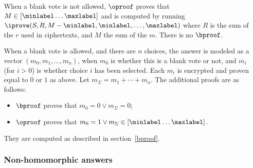 \documentclass[a4paper]{article}
\begin{document}
When a blank vote is not allowed, $\oproof$ proves that
$M\in[\minlabel\dots\maxlabel]$ and is computed by running
$\iprove(S,R,M-\minlabel,\minlabel,\dots,\maxlabel)$ where $R$ is the
sum of the $r$ used in ciphertexts, and $M$ the sum of the $m$. There
is no $\bproof$.

When a blank vote is allowed, and there are $n$ choices, the answer is
modeled as a vector $(m_0,m_1,\dotsc,m_n)$, when $m_0$ is whether this
is a blank vote or not, and $m_i$ (for $i>0$) is whether choice $i$
has been selected. Each $m_i$ is encrypted and proven equal to $0$ or
$1$ as above. Let $m_\Sigma=m_1+\dotsb+m_n$. The additional proofs
are as follows:
\begin{itemize}
\item $\bproof$ proves that $m_0=0\lor m_\Sigma=0$;
\item $\oproof$ proves that $m_0=1\lor m_\Sigma\in[\minlabel\dots\maxlabel]$.
\end{itemize}
They are computed as described in section~\ref{bproof}.

\subsubsection{Non-homomorphic answers}
\label{nh-answers}
\end{document}

